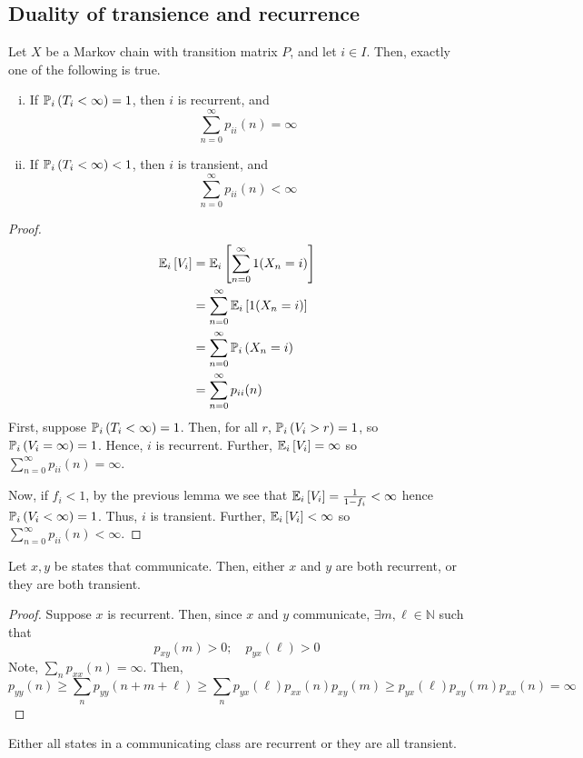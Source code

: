 \subsection{Duality of transience and recurrence}
\begin{theorem}
	Let \( X \) be a Markov chain with transition matrix \( P \), and let \( i \in I \).
	Then, exactly one of the following is true.
	\begin{enumerate}[(i)]
		\item If \( \mathbb{P}_{i}\left({T_i < \infty}\right) = 1 \), then \( i \) is recurrent, and
		      \[
			      \sum_{n=0}^\infty p_{ii}(n) = \infty
		      \]
		\item If \( \mathbb{P}_{i}\left({T_i < \infty}\right) < 1 \), then \( i \) is transient, and
		      \[
			      \sum_{n=0}^\infty p_{ii}(n) < \infty
		      \]
	\end{enumerate}
\end{theorem}
\begin{proof}
	\begin{align*}
		\mathbb{E}_{i}\left[{V_i}\right] & = \mathbb{E}_{i}\left[{\sum_{n=0}^\infty 1(X_n = i)}\right] \\
		              & = \sum_{n=0}^\infty \mathbb{E}_{i}\left[{1(X_n = i)}\right] \\
		              & = \sum_{n=0}^\infty \mathbb{P}_{i}\left({X_n = i}\right)    \\
		              & = \sum_{n=0}^\infty p_{ii}(n)
	\end{align*}
	First, suppose \( \mathbb{P}_{i}\left({T_i < \infty}\right) = 1 \).
	Then, for all \( r \), \( \mathbb{P}_{i}\left({V_i > r}\right) = 1 \), so \( \mathbb{P}_{i}\left({V_i = \infty}\right) = 1 \).
	Hence, \( i \) is recurrent.
	Further, \( \mathbb{E}_{i}\left[{V_i}\right] = \infty \) so \( \sum_{n=0}^\infty p_{ii}(n) = \infty \).

	Now, if \( f_i < 1 \), by the previous lemma we see that \( \mathbb{E}_{i}\left[{V_i}\right] = \frac{1}{1-f_i} < \infty \) hence \( \mathbb{P}_{i}\left({V_i < \infty}\right) = 1 \).
	Thus, \( i \) is transient.
	Further, \( \mathbb{E}_{i}\left[{V_i}\right] < \infty \) so \( \sum_{n=0}^\infty p_{ii}(n) < \infty \).
\end{proof}
\begin{theorem}
	Let \( x, y \) be states that communicate.
	Then, either \( x \) and \( y \) are both recurrent, or they are both transient.
\end{theorem}
\begin{proof}
	Suppose \( x \) is recurrent.
	Then, since \( x \) and \( y \) communicate, \( \exists m, \ell \in \mathbb N \) such that
	\[
		p_{xy}(m) > 0;\quad p_{yx}(\ell) > 0
	\]
	Note, \( \sum_n p_{xx}(n) = \infty \).
	Then,
	\[
		p_{yy}(n) \geq \sum_n p_{yy}(n+m+\ell) \geq \sum_n p_{yx}(\ell) p_{xx}(n) p_{xy}(m) \geq p_{yx}(\ell) p_{xy}(m) p_{xx}(n) = \infty
	\]
\end{proof}
\begin{corollary}
	Either all states in a communicating class are recurrent or they are all transient.
\end{corollary}

